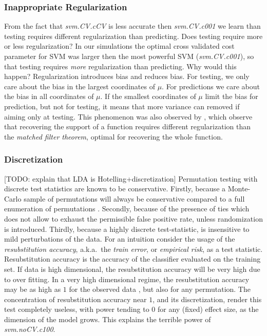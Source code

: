 \documentclass[onecolumn,draftclsnofoot]{IEEEtran}
\begin{document}
\subsubsection{Inappropriate Regularization}
From the fact that \emph{svm.CV.cCV} is less accurate then \emph{svm.CV.c001} we learn than testing requires different regularization than predicting.
Does testing require more or less regularization?
In our simulations the optimal cross validated cost parameter for SVM was larger then the most powerful SVM (\emph{svm.CV.c001}), so that testing requires \emph{more} regularization  than predicting. 
Why would this happen?
Regularization introduces bias and reduces bias. 
For testing, we only care about the bias in the largest coordinates of $\mu$. 
For predictions we care about the bias in all coordinates of $\mu$. 
If the smallest coordinates of $\mu$ limit the bias for prediction, but not for testing, it means that more variance can removed if aiming only at testing. 
This phenomenon was also observed by \cite{cheng2017multiple}, which observe that recovering the support of a function requires different regularization than the \emph{matched filter theorem}, optimal for recovering the whole function.


\subsubsection{Discretization}
[TODO: explain that LDA is Hotelling+discretization]
Permutation testing with discrete test statistics are known to be conservative.
Firstly, because a Monte-Carlo sample of permutations will always be conservative compared to a full enumeration of permutations \cite{hemerik_exact_2014}.
Secondly, because of the presence of ties which does not allow to exhaust the permissible false positive rate, unless randomization is introduced.
Thirdly, because a highly discrete test-statistic, is insensitive to mild perturbations of the data.
For an intuition consider the usage of the \emph{resubstitution accuracy}, a.k.a.\ the \emph{train error}, or \emph{empirical risk}, as a test statistic. 
Resubstitution accuracy is the accuracy of the classifier evaluated on the training set.
If data is high dimensional, the resubstitution accuracy will be very high due to over fitting. 
In a very high dimensional regime, the resubstitution accuracy may be as high as $1$ for the observed data \cite[Theorem 1]{mclachlan_bias_1976}, but also for any permutation.
The concentration of resubstitution accuracy near $1$, and its discretization, render this test completely useless, with power tending to $0$ for any (fixed) effect size, as the dimension of the model grows. 
This explains the terrible power of \emph{svm.noCV.c100}.
\end{document}
